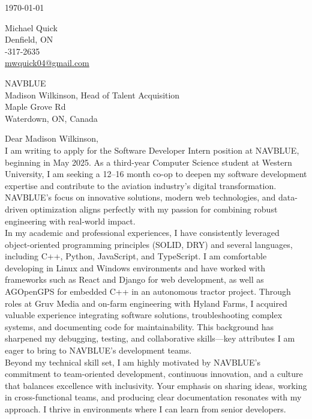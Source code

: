 \documentclass[11pt]{article}
\begin{document}
\begin{flushright}
\today
\end{flushright}

\noindent Michael Quick \\
\noindent Denfield, ON \\
-317-2635 \\
\noindent \href{mailto:mwquick04@gmail.com}{mwquick04@gmail.com} \\

\vspace{1em}

\noindent NAVBLUE \\
\noindent Madison Wilkinson, Head of Talent Acquisition\\
 Maple Grove Rd \\
\noindent Waterdown, ON, Canada\\

\vspace{1em}

\noindent Dear Madison Wilkinson,\\


I am writing to apply for the Software Developer Intern position at NAVBLUE, beginning in May 2025. As a third-year Computer Science student at Western University, I am seeking a 12–16 month co-op to deepen my software development expertise and contribute to the aviation industry’s digital transformation. NAVBLUE’s focus on innovative solutions, modern web technologies, and data-driven optimization aligns perfectly with my passion for combining robust engineering with real-world impact.\\

In my academic and professional experiences, I have consistently leveraged object-oriented programming principles (SOLID, DRY) and several languages, including C++, Python, JavaScript, and TypeScript. I am comfortable developing in Linux and Windows environments and have worked with frameworks such as React and Django for web development, as well as AGOpenGPS for embedded C++ in an autonomous tractor project. Through roles at Gruv Media and on-farm engineering with Hyland Farms, I acquired valuable experience integrating software solutions, troubleshooting complex systems, and documenting code for maintainability. This background has sharpened my debugging, testing, and collaborative skills—key attributes I am eager to bring to NAVBLUE’s development teams.\\

Beyond my technical skill set, I am highly motivated by NAVBLUE’s commitment to team-oriented development, continuous innovation, and a culture that balances excellence with inclusivity. Your emphasis on sharing ideas, working in cross-functional teams, and producing clear documentation resonates with my approach. I thrive in environments where I can learn from senior developers.\\
\end{document}
